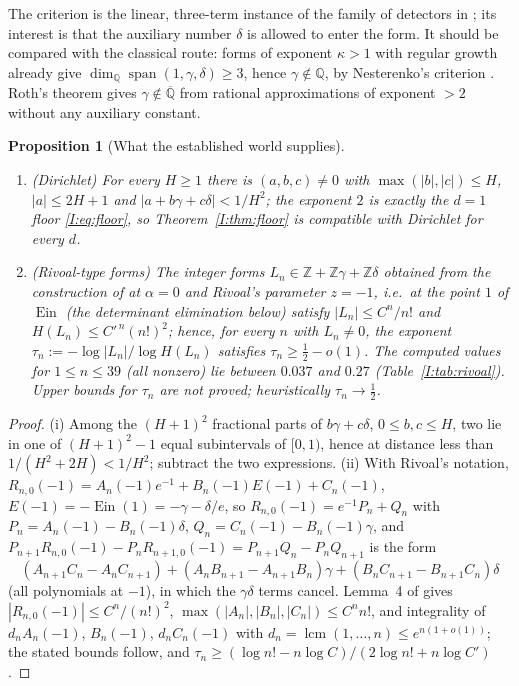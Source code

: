 \documentclass[11pt,a4paper]{article}
\newcommand{\Q}{\mathbb Q}
\newcommand{\Z}{\mathbb Z}
\newcommand{\Qbar}{\overline{\mathbb Q}}
\newcommand{\Ein}{\operatorname{Ein}}
\newtheorem{proposition}[theorem]{Proposition}
\theoremstyle{definition}
\theoremstyle{remark}
\numberwithin{equation}{section}
\begin{document}
The criterion is the linear, three-term instance of the family of detectors in
\cite[Cor.~``Fixed-degree approximation detector'']{K001}; its interest is that the
auxiliary number $\delta$ is allowed to enter the form. It should be compared with the
classical route: forms of exponent $\kappa>1$ with regular growth already give
$\dim_\Q\operatorname{span}(1,\gamma,\delta)\ge3$, hence $\gamma\notin\Q$, by Nesterenko's
criterion \cite{Nesterenko,Fischler}. Roth's theorem gives $\gamma\notin\Qbar$ from
rational approximations of exponent $>2$ without any auxiliary constant.

\begin{proposition}[What the established world supplies]\label{I:prop:supply}
\begin{enumerate}[label=(\roman*)]
\item (Dirichlet) For every $H\ge1$ there is $(a,b,c)\ne0$ with $\max(|b|,|c|)\le H$,
$|a|\le2H+1$ and $|a+b\gamma+c\delta|<1/H^2$; the exponent $2$ is exactly the $d=1$
floor \eqref{I:eq:floor}, so Theorem~\ref{I:thm:floor} is compatible with Dirichlet for
every $d$.
\item (Rivoal-type forms) The integer forms $L_n\in\Z+\Z\gamma+\Z\delta$ obtained from the
construction of \cite[\S\S3--6]{Rivoal2012} at $\alpha=0$ and Rivoal's parameter
$z=-1$, i.e.\ at the point $1$ of $\Ein$ (the determinant elimination below) satisfy $|L_n|\le C^n/n!$ and $H(L_n)\le C'^{\,n}(n!)^2$; hence, for
every $n$ with $L_n\ne0$, the exponent $\tau_n:=-\log|L_n|/\log H(L_n)$ satisfies
$\tau_n\ge\tfrac12-o(1)$. The computed values for $1\le n\le39$ (all nonzero) lie between
$0.037$ and $0.27$ (Table~\ref{I:tab:rivoal}). Upper bounds for $\tau_n$ are not proved;
heuristically $\tau_n\to\tfrac12$.
\end{enumerate}
\end{proposition}
\begin{proof}
(i) Among the $(H+1)^2$ fractional parts of $b\gamma+c\delta$, $0\le b,c\le H$, two lie
in one of $(H+1)^2-1$ equal subintervals of $[0,1)$, hence at distance less than
$1/(H^2+2H)<1/H^2$; subtract the two expressions. (ii) With
Rivoal's notation, $R_{n,0}(-1)=A_n(-1)e^{-1}+B_n(-1)E(-1)+C_n(-1)$,
$E(-1)=-\Ein(1)=-\gamma-\delta/e$, so $R_{n,0}(-1)=e^{-1}P_n+Q_n$ with
$P_n=A_n(-1)-B_n(-1)\delta$, $Q_n=C_n(-1)-B_n(-1)\gamma$, and
$P_{n+1}R_{n,0}(-1)-P_nR_{n+1,0}(-1)=P_{n+1}Q_n-P_nQ_{n+1}$ is the form
\[
 (A_{n+1}C_n-A_nC_{n+1})+(A_nB_{n+1}-A_{n+1}B_n)\gamma+(B_nC_{n+1}-B_{n+1}C_n)\delta
\]
(all polynomials at $-1$), in which the $\gamma\delta$ terms cancel. Lemma~4 of
\cite{Rivoal2012} gives $|R_{n,0}(-1)|\le C^n/(n!)^2$,
$\max(|A_n|,|B_n|,|C_n|)\le C^nn!$, and integrality of $d_nA_n(-1)$, $B_n(-1)$,
$d_nC_n(-1)$ with $d_n=\operatorname{lcm}(1,\dots,n)\le e^{n(1+o(1))}$; the stated
bounds follow, and $\tau_n\ge(\log n!-n\log C)/(2\log n!+n\log C')$.
\end{proof}
\end{document}
